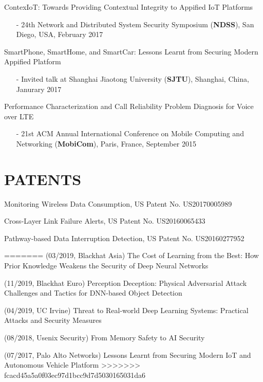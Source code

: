 \documentclass[margin]{res}
\begin{document}
\begin{resume}
ContexIoT: Towards Providing Contextual Integrity to Appified IoT Platforms
\begin{itemize}
    \item[-] 24th Network and Distributed System Security Symposium (\textbf{NDSS}), San Diego, USA, February 2017
\end{itemize}

SmartPhone, SmartHome, and SmartCar: Lessons Learnt from Securing Modern Appified Platform
\begin{itemize}
\item[-] Invited talk at Shanghai Jiaotong University (\textbf{SJTU}), Shanghai, China, Janurary 2017
\end{itemize}

Performance Characterization and Call Reliability Problem Diagnosis for Voice over LTE
\begin{itemize}
\item[-] 21st  ACM Annual International Conference on Mobile Computing and Networking (\textbf{MobiCom}), Paris, France, September 2015
\end{itemize}

\section{PATENTS}
Monitoring Wireless Data Consumption, US Patent No. US20170005989 \href{https://www.google.com/patents/US20170005989}{\color{blue}{[Link]}}

Cross-Layer Link Failure Alerts, US Patent No. US20160065433 \href{https://www.google.com/patents/US20160065433}{\color{blue}{[Link]}}

Pathway-based Data Interruption Detection, US Patent No. US20160277952 \href{https://www.google.com/patents/US20160277952}{\color{blue}{[Link]}}


=======
(03/2019, Blackhat Asia) The Cost of Learning from the Best: How Prior Knowledge Weakens the Security of Deep Neural Networks

(11/2019, Blackhat Euro) Perception Deception: Physical Adversarial Attack Challenges and Tactics for DNN-based Object Detection

(04/2019, UC Irvine) Threat to Real-world Deep Learning Systems: Practical Attacks and Security Measures

(08/2018, Usenix Security) From Memory Safety to AI Security

(07/2017, Palo Alto Networks) Lessons Learnt from Securing Modern IoT and Autonomous Vehicle Platform
>>>>>>> fcacd45a5a0f03ec97d1bcc9d7d5030165031da6


\end{resume}
\end{document}
